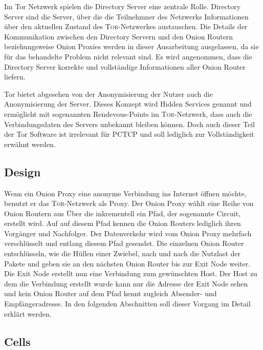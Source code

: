 \documentclass[fleqn,envcountsame,runningheads,10pt,a4paper]{llncs}
\begin{document}
Im Tor Netzwerk spielen die Directory Server eine zentrale Rolle.
Directory Server sind die Server, über die die Teilnehmner des Netzwerks Informationen über den aktuellen Zustand des \textsc{Tor}-Netzwerkes austauschen.
Die Details der Kommunikation zwischen den Directory Servern und den Onion Routern beziehungsweise Onion Proxies werden in dieser Ausarbeitung ausgelassen, da sie für das behandelte Problem nicht relevant sind.
Es wird angenommen, dass die Directory Server korrekte und vollständige Informationen aller Onion Router liefern.

Tor bietet abgesehen von der Anonymisierung der Nutzer auch die Anonymisierung der Server. 
Dieses Konzept wird Hidden Services genannt und ermöglicht mit sogenannten Rendevous-Points im \textsc{Tor}-Netzwerk, dass auch die Verbindungsdaten des Servers unbekannt bleiben können.
Doch auch dieser Teil der Tor Software ist irrelevant für PCTCP und soll lediglich zur Vollständigkeit erwähnt werden.



\subsection{Design}

Wenn ein Onion Proxy eine anonyme Verbindung ins Internet öffnen möchte, benutzt er das \textsc{Tor}-Netzwerk als Proxy. Der Onion Proxy wählt eine Reihe von Onion Routern aus Über die inkrementell ein Pfad, der sogenannte Circuit, erstellt wird. Auf auf diesem Pfad kennen die Onion Routers lediglich ihren Vorgänger und Nachfolger. Der Datenverkehr wird vom Onion Proxy mehrfach verschlüsselt und entlang diesem Pfad gesendet. Die einzelnen Onion Router entschlüsseln, wie die Hüllen einer Zwiebel, nach und nach die Nutzlast der Pakete und geben sie an den nächsten Onion Router bis zur Exit Node weiter. Die Exit Node erstellt nun eine Verbindung zum gewünschten Host. Der Host zu dem die Verbindung erstellt wurde kann nur die Adresse der Exit Node sehen und kein Onion Router auf dem Pfad kennt zugleich Absender- und Empfängeradresse. In den folgenden Abschnitten soll dieser Vorgang im Detail erklärt werden.

\subsection{Cells}
\end{document}
